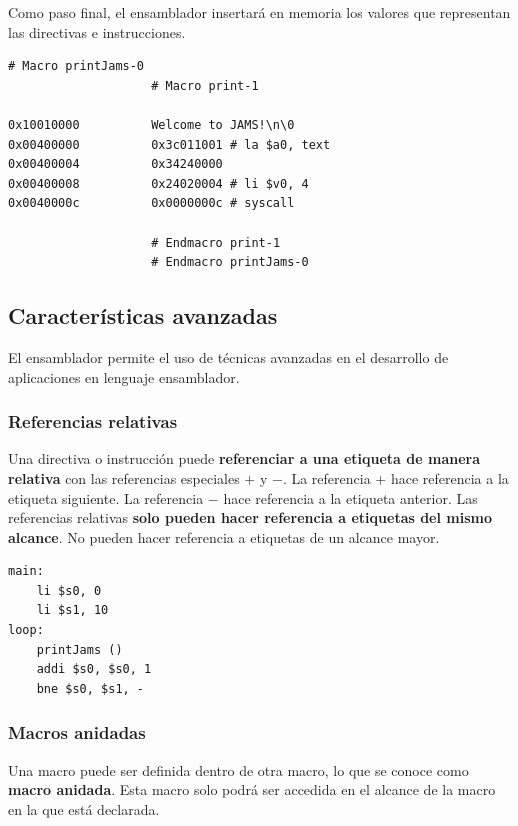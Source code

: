 Como paso final, el ensamblador insertará en memoria los valores
que representan las directivas e instrucciones.

\begin{lstlisting}[frame=single,label={lst:value-assignation}]
                    # Macro printJams-0
                    # Macro print-1

0x10010000          Welcome to JAMS!\n\0
0x00400000          0x3c011001 # la $a0, text
0x00400004          0x34240000
0x00400008          0x24020004 # li $v0, 4
0x0040000c          0x0000000c # syscall

                    # Endmacro print-1
                    # Endmacro printJams-0
\end{lstlisting}

\subsection{Características avanzadas}\label{subsec:características-avanzadas}

El ensamblador permite el uso de técnicas avanzadas en
el desarrollo de aplicaciones en lenguaje ensamblador.

\subsubsection{Referencias relativas}\label{subsubsec:referencias-relativas}

Una directiva o instrucción puede \textbf{referenciar a una etiqueta de manera
relativa} con las referencias especiales $+$ y $-$.
La referencia $+$ hace referencia a la etiqueta siguiente.
La referencia $-$ hace referencia a la etiqueta anterior.
Las referencias relativas \textbf{solo pueden hacer referencia
a etiquetas del mismo alcance}.
No pueden hacer referencia a etiquetas de un alcance mayor.

\begin{lstlisting}[frame=single,label={lst:relative-reference}]
main:
    li $s0, 0
    li $s1, 10
loop:
    printJams ()
    addi $s0, $s0, 1
    bne $s0, $s1, -
\end{lstlisting}

\subsubsection{Macros anidadas}\label{subsubsec:macros-anidadas}

Una macro puede ser definida dentro de otra macro,
lo que se conoce como \textbf{macro anidada}.
Esta macro solo podrá ser accedida en el alcance de la macro
en la que está declarada.

